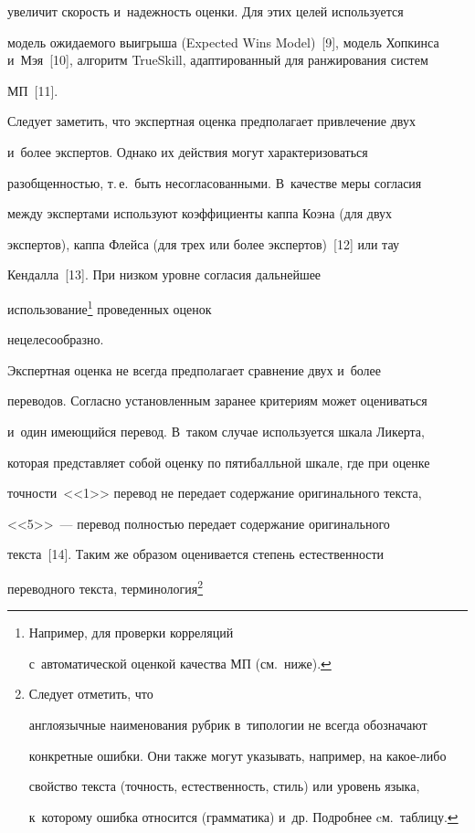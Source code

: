 увеличит скорость и~надежность оценки. Для этих целей используется 

модель ожидаемого выигрыша (Expected Wins Model)~[9], модель Хопкинса и~Мэя~[10], алгоритм TrueSkill, адаптированный для ранжирования систем 

МП~[11].

  

  Следует заметить, что экспертная оценка предполагает привлечение двух 

  и~более экспертов. Однако их действия могут характеризоваться 

разоб\-щен\-ностью, т.\,е.\ быть несогласованными. В~качестве меры согласия 

между экспертами используют коэффициенты каппа Коэна (для двух 

экспертов), каппа Флейса (для трех или более экспертов)~[12] или тау 

Кендалла~[13]. При низком уровне согласия дальнейшее 

использование\footnote[1]{Например, для проверки корреляций 

с~автоматической оценкой качества МП (см.\ ниже).} проведенных оценок 

нецелесообразно.

  

  Экспертная оценка не всегда предполагает сравнение двух и~более 

переводов. Согласно установленным заранее критериям может оцениваться 

и~один имеющийся перевод. В~таком случае используется шкала Ликерта, 

которая представляет собой оценку по пятибалльной шкале, где при оценке 

точности~<<1>> перевод не передает содержание оригинального текста, 

<<5>>~--- перевод полностью передает содержание оригинального 

текста~[14]. Таким же образом оценивается степень естественности 

переводного текста, терминология\footnote[2]{Следует отметить, что 

англоязычные наименования рубрик в~типологии не всегда обозначают 

конкретные ошибки. Они также могут указывать, например, на какое-либо 

свойство текста (точность, естественность, стиль) или уровень языка, 

к~которому ошибка относится (грамматика) и~др. Подробнее cм.\  таблицу.} 

